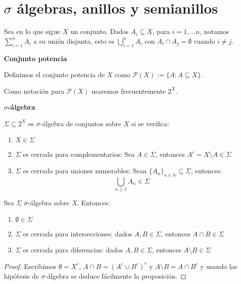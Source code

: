 \section{$\sigma$ álgebras, anillos y semianillos}

Sea en lo que sigue $X$ un conjunto. Dados $A_i \subseteq X$, para $i=1, \ldots n$, notamos $\sum_{i=1}^n A_i$
a su unión disjunta, esto es $\bigcup_{i=1}^n A_i$ con $A_i \cap A_j = \emptyset$ cuando $i\neq j$.

\begin{definition} \textbf{Conjunto potencia}

 Definimos el conjunto potencia de $X$ como $\mathcal{P}(X):= \{A: A\subseteq X\}$.
 
 Como notación para $\mathcal{P}(X)$ usaremos frecuentemente $2^X$.
\end{definition}


\begin{definition} \textbf{$\sigma$-álgebra}

 $\Sigma \subseteq 2^X$ es $\sigma$-álgebra de conjuntos sobre $X$ si se verifica:
 
 \begin{enumerate}[i]
  \item $X \in \Sigma$
  \item $\Sigma$ es cerrada para complementarios: Sea $A\in \Sigma$, entonces $A^c = X\setminus A \in \Sigma$
  \item $\Sigma$ es cerrada para uniones numerables: Sean $\{A_n\}_{n\in\mathbb{N}} \subseteq \Sigma$, entonces: 
  \[\underset{n \ge 1}{\bigcup} A_n \in \Sigma\]
 \end{enumerate}
\end{definition}

\begin{fact}
 Sea $\Sigma$ $\sigma$-álgebra sobre $X$. Entonces:
 
 \begin{enumerate}[i]
  \item $\emptyset \in \Sigma$
  \item $\Sigma$ es cerrada para intersecciones: dados $A,B \in \Sigma$, entonces $A\cap B \in \Sigma$
  \item $\Sigma$ es cerrada para diferencias: dados $A,B \in \Sigma$, entonces $A\setminus B \in \Sigma$
 \end{enumerate}
 
 \label{fact:propsigma}
\end{fact}

\begin{proof}
 Escribimos $\emptyset = X^c$, $A\cap B = (A^c \cup B^c)^c$ y $A\setminus B = A\cap B^c$
 y usando las hipótesis de $\sigma$-álgebra se deduce fácilmente la proposición.
\end{proof}

